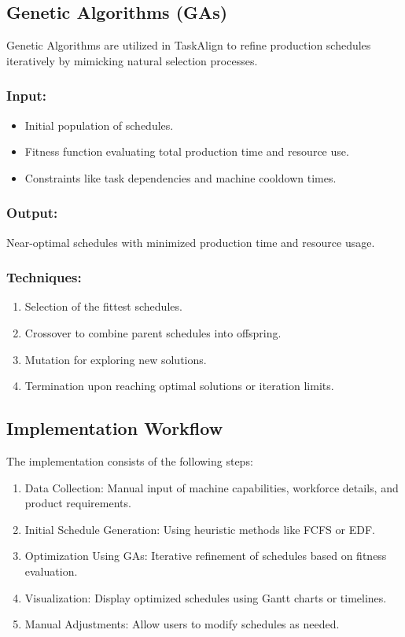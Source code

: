 \subsection{Genetic Algorithms (GAs)}
Genetic Algorithms are utilized in TaskAlign to refine production schedules iteratively by mimicking natural selection processes.

\subsubsection*{Input:}
\begin{itemize}
    \item Initial population of schedules.
    \item Fitness function evaluating total production time and resource use.
    \item Constraints like task dependencies and machine cooldown times.
\end{itemize}

\subsubsection*{Output:}
Near-optimal schedules with minimized production time and resource usage.

\subsubsection*{Techniques:}
\begin{enumerate}
    \item Selection of the fittest schedules.
    \item Crossover to combine parent schedules into offspring.
    \item Mutation for exploring new solutions.
    \item Termination upon reaching optimal solutions or iteration limits.
\end{enumerate}

\subsection{Implementation Workflow}

The implementation consists of the following steps:
\begin{enumerate}
    \item Data Collection: Manual input of machine capabilities, workforce details, and product requirements.
    \item Initial Schedule Generation: Using heuristic methods like FCFS or EDF.
    \item Optimization Using GAs: Iterative refinement of schedules based on fitness evaluation.
    \item Visualization: Display optimized schedules using Gantt charts or timelines.
    \item Manual Adjustments: Allow users to modify schedules as needed.
\end{enumerate}

